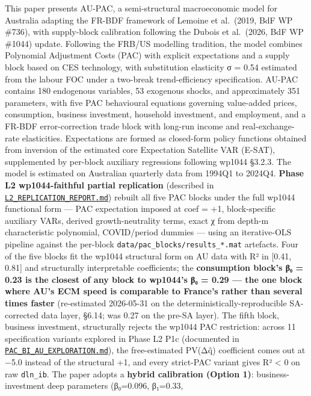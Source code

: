 \documentclass[
]{article}
\begin{document}
This paper presents AU-PAC, a semi-structural macroeconomic model for
Australia adapting the FR-BDF framework of Lemoine et al.~(2019, BdF WP
\#736), with supply-block calibration following the Dubois et al.~(2026,
BdF WP \#1044) update. Following the FRB/US modelling tradition, the
model combines Polynomial Adjustment Costs (PAC) with explicit
expectations and a supply block based on CES technology, with
substitution elasticity σ = 0.54 estimated from the labour FOC under a
two-break trend-efficiency specification. AU-PAC contains 180 endogenous
variables, 53 exogenous shocks, and approximately 351 parameters, with
five PAC behavioural equations governing value-added prices,
consumption, business investment, household investment, and employment,
and a FR-BDF error-correction trade block with long-run income and
real-exchange-rate elasticities. Expectations are formed as closed-form
policy functions obtained from inversion of the estimated core
Expectation Satellite VAR (E-SAT), supplemented by per-block auxiliary
regressions following wp1044 §3.2.3. The model is estimated on
Australian quarterly data from 1994Q1 to 2024Q4. \textbf{Phase L2
wp1044-faithful partial replication} (described in
\href{../L2_REPLICATION_REPORT.md}{\texttt{L2\_REPLICATION\_REPORT.md}})
rebuilt all five PAC blocks under the full wp1044 functional form ---
PAC expectation imposed at coef = +1, block-specific auxiliary VARs,
derived growth-neutrality terms, exact χ from depth-m characteristic
polynomial, COVID/period dummies --- using an iterative-OLS pipeline
against the per-block \texttt{data/pac\_blocks/results\_*.mat}
artefacts. Four of the five blocks fit the wp1044 structural form on AU
data with R² in {[}0.41, 0.81{]} and structurally interpretable
coefficients; the \textbf{consumption block's β₀ = 0.23 is the closest
of any block to wp1044's β₀ = 0.29 --- the one block where AU's ECM
speed is comparable to France's rather than several times faster}
(re-estimated 2026-05-31 on the deterministically-reproducible
SA-corrected data layer, §6.14; was 0.27 on the pre-SA layer). The fifth
block, business investment, structurally rejects the wp1044 PAC
restriction: across 11 specification variants explored in Phase L2 P1c
(documented in
\href{../PAC_BI_AU_EXPLORATION.md}{\texttt{PAC\_BI\_AU\_EXPLORATION.md}}),
the free-estimated PV(Δq̂) coefficient comes out at −5.0 instead of the
structural +1, and every strict-PAC variant gives R² \textless{} 0 on
raw \texttt{dln\_ib}. The paper adopts a \textbf{hybrid calibration
(Option 1)}: business-investment deep parameters (β₀=0.096, β₁=0.33,
\end{document}
